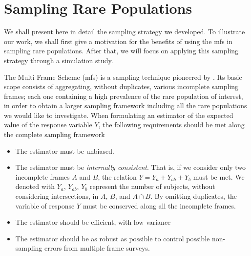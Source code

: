 \section{Sampling Rare Populations}

We shall present here in detail the sampling strategy we developed. 
To illustrate our work, we shall first give a motivation for the benefits of using the \gls{mfs} in sampling rare populations.
After that, we will focus on applying this sampling strategy through a simulation study.

The Multi Frame Scheme (\gls{mfs}) is a sampling technique pioneered by \cite{hartley1962sampling}.
Its basic scope consists of aggregating, without duplicates, various incomplete sampling frames; each one containing a high prevalence of the rare population of interest, in order to obtain a larger sampling framework including all the rare populations we would like to investigate.
When formulating an estimator of the expected value of the response variable $Y$, the following requirements should be met along the complete sampling framework \cite[]{lohr2011alternative}
\begin{itemize}
    \item The estimator must be unbiased.

    \item The estimator must be \emph{internally consistent}. 
    That is, if we consider only two incomplete frames $A$ and $B$, the relation $Y = Y_a + Y_{ab} + Y_{b}$ must be met.
    We denoted with $Y_a$, $Y_{ab}$, $Y_{b}$ represent the number of subjects, without considering intersections, in $A$, $B$, and $A\cap B.$ 
    By omitting duplicates, the variable of response $Y$ must be conserved along all the incomplete frames. 

    \item The estimator should be efficient, with low variance

    \item The estimator should be as robust as possible to control possible non-sampling errors from multiple frame surveys.
\end{itemize}

